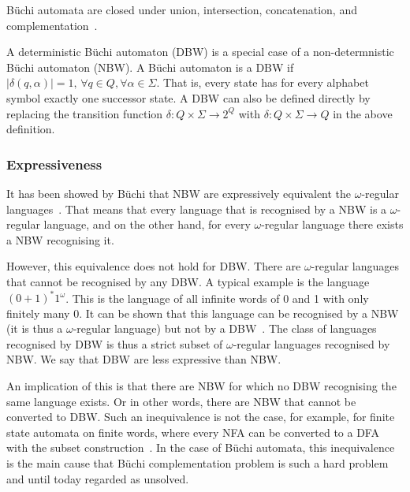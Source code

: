 \documentclass{scrreprt}
\newcommand{\om}{{$\omega$}}
\begin{document}
Büchi automata are closed under union, intersection, concatenation, and complementation~\cite{1996_vardi}.

A deterministic Büchi automaton (DBW) is a special case of a non-determnistic Büchi automaton (NBW). A Büchi automaton is a DBW if $|\delta(q,\alpha)| = 1, \, \forall q \in Q, \forall \alpha \in \Sigma $. That is, every state has for every alphabet symbol exactly one successor state. A DBW can also be defined directly by replacing the transition function $\delta: Q \times \Sigma \rightarrow 2^Q$ with $\delta: Q \times \Sigma \rightarrow Q$ in the above definition.

\subsubsection{Expressiveness}
It has been showed by Büchi that NBW are expressively equivalent the \om-regular languages~\cite{buchi1960decision}. That means that every language that is recognised by a NBW is a \om-regular language, and on the other hand, for every \om-regular language there exists a NBW recognising it.

However, this equivalence does not hold for DBW. There are \om-regular languages that cannot be recognised by any DBW. A typical example is the language $(0+1)^*1^\omega$. This is the language of all infinite words of 0 and 1 with only finitely many 0. It can be shown that this language can be recognised by a NBW (it is thus a \om-regular language) but not by a DBW~\cite{1996_vardi}\cite{2002_roggenbach}. The class of languages recognised by DBW is thus a strict subset of \om-regular languages recognised by NBW. We say that DBW are less expressive than NBW.

An implication of this is that there are NBW for which no DBW recognising the same language exists. Or in other words, there are NBW that cannot be converted to DBW. Such an inequivalence is not the case, for example, for finite state automata on finite words, where every NFA can be converted to a DFA with the subset construction~\cite{hopcroft2006automata}\cite{1959_rabin}. In the case of Büchi automata, this inequivalence is the main cause that Büchi complementation problem is such a hard problem~\cite{niessner1997deterministic} and until today regarded as unsolved. 



\end{document}
